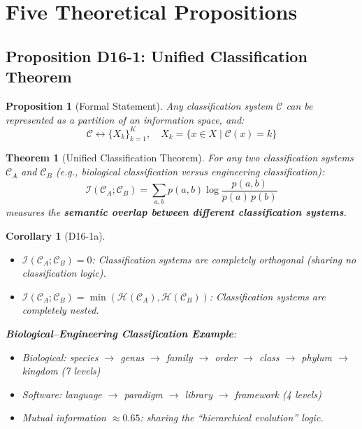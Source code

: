 \documentclass[12pt, a4paper]{article}
\newtheorem{theorem}{Theorem}[section]
\newtheorem{corollary}{Corollary}[section]
\newtheorem{proposition}{Proposition}[section]
\newcommand{\calI}{\mathcal{I}}
\begin{document}
\section{Five Theoretical Propositions}

\subsection{Proposition D16-1: Unified Classification Theorem}

\begin{proposition}[Formal Statement]
Any classification system $\mathcal{C}$ can be represented as a partition of an information space, and:
\[
\mathcal{C} \longleftrightarrow \{X_k\}_{k=1}^{K},\quad X_k = \{x \in X \mid \mathcal{C}(x) = k\}
\]
\end{proposition}

\begin{theorem}[Unified Classification Theorem]\label{thm:D16-1}
For any two classification systems $\mathcal{C}_A$ and $\mathcal{C}_B$ (e.g., biological classification versus engineering classification):
\[
\calI(\mathcal{C}_A; \mathcal{C}_B) = \sum_{a,b} p(a,b) \log \frac{p(a,b)}{p(a)\,p(b)}
\]
measures the \textbf{semantic overlap between different classification systems}.
\end{theorem}

\begin{corollary}[D16-1a]\label{corr:D16-1a}
\begin{itemize}
    \item $\calI(\mathcal{C}_A; \mathcal{C}_B) = 0$: Classification systems are completely orthogonal (sharing no classification logic).
    \item $\calI(\mathcal{C}_A; \mathcal{C}_B) = \min(\mathcal{H}(\mathcal{C}_A), \mathcal{H}(\mathcal{C}_B))$: Classification systems are completely nested.
\end{itemize}

\textbf{Biological--Engineering Classification Example}:
\begin{itemize}
    \item Biological: species $\to$ genus $\to$ family $\to$ order $\to$ class $\to$ phylum $\to$ kingdom (7 levels)
    \item Software: language $\to$ paradigm $\to$ library $\to$ framework (4 levels)
    \item Mutual information $\approx 0.65$: sharing the ``hierarchical evolution'' logic.
\end{itemize}
\end{corollary}
\end{document}
